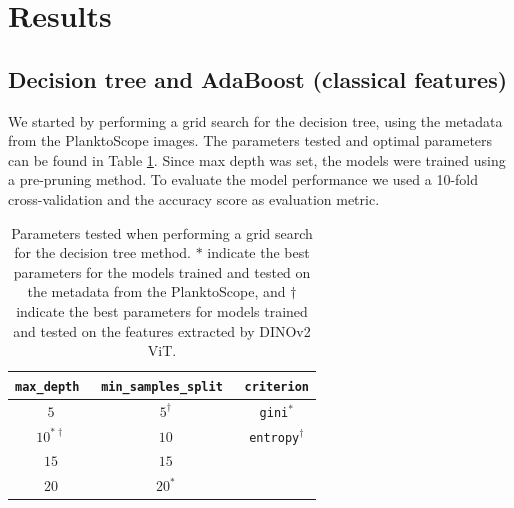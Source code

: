\section{Results}\label{sec:results}
%
\subsection{Decision tree and AdaBoost (classical features)}\label{ssec:dt_ada_metadata}
We started by performing a grid search for the decision tree, using the metadata from the PlanktoScope images. The parameters tested and optimal parameters can be found in Table \ref{tab:params_tree}. Since max depth was set, the models were trained using a pre-pruning method. To evaluate the model performance we used a 10-fold cross-validation and the accuracy score as evaluation metric.
\begin{table}[h]
    \centering
    \begin{tabular}{ccc}
        \hline
        \verb|max_depth| \, & \verb|min_samples_split| \, & \verb|criterion| \\
        \hline 
        $5$ & $5^{\dagger}$ & \verb|gini|$^*$ \\
        $10^{*\dagger}$ & $10$ & \verb|entropy|$^{\dagger}$ \\
        $15$ & $15$ & \\
        $20$ & $20^*$ & \\
        \hline
    \end{tabular}
    \caption{Parameters tested when performing a grid search for the decision tree method. $*$ indicate the best parameters for the models trained and tested on the metadata from the PlanktoScope, and $\dagger$ indicate the best parameters for models trained and tested on the features extracted by DINOv2 ViT.}
    \label{tab:params_tree}
\end{table}

